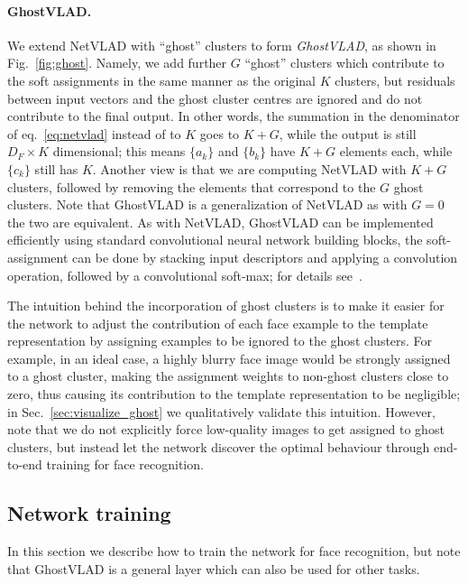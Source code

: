 \documentclass[runningheads]{llncs}
\begin{document}
\paragraph{GhostVLAD.}
We extend NetVLAD with ``ghost'' clusters to form \emph{GhostVLAD},
as shown in Fig.~\ref{fig:ghost}.
Namely, we add further $G$
``ghost'' clusters which contribute to the soft assignments in the
same manner as the original $K$ clusters,
but residuals between input vectors and the ghost cluster centres
are ignored and do not contribute to the final output.
In other words, the summation in the denominator of
eq.~\ref{eq:netvlad} instead of to $K$ goes to $K+G$,
while the output is still $D_F \times K$ dimensional;
this means $\{a_k\}$ and $\{b_k\}$ have $K+G$ elements each,
while $\{c_k\}$ still has $K$.
Another view is that we are computing NetVLAD with $K+G$ clusters,
followed by removing the elements that correspond to the $G$
ghost clusters.
Note that GhostVLAD is a generalization of NetVLAD as with $G=0$
the two are equivalent.
As with NetVLAD, GhostVLAD can be implemented efficiently using
standard convolutional neural network building blocks,
\eg the soft-assignment can be done by stacking input descriptors
and applying a convolution operation, followed by a convolutional soft-max;
for details see~\cite{Arandjelovic16}.

The intuition behind the incorporation of ghost clusters is to
make it easier for the network to adjust
the contribution of each face example to the template representation
by assigning examples to be ignored to the ghost clusters.
For example, in an ideal case, a highly blurry face image
would be strongly assigned to a ghost cluster,
making the assignment weights to non-ghost clusters close to zero,
thus causing its contribution to the template representation
to be negligible;
in Sec.~\ref{sec:visualize_ghost} we qualitatively
validate this intuition.
However, note that we do not explicitly force low-quality images to
get assigned to ghost clusters, but instead let the network discover
the optimal behaviour through end-to-end training for face recognition.







\subsection{Network training}
\label{sec:train}
In this section we describe how to train the network for
face recognition, but note that GhostVLAD is a general layer which can
also be used for other tasks.
\end{document}
